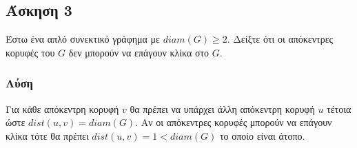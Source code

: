 \subsection*{Άσκηση 3}

Έστω ένα απλό συνεκτικό γράφημα με $diam(G) \ge 2$. Δείξτε ότι οι απόκεντρες κορυφές του $G$ δεν μπορούν να επάγουν κλίκα στο $G$.

\subsubsection*{Λύση}

Για κάθε απόκεντρη κορυφή $v$ θα πρέπει να υπάρχει άλλη απόκεντρη κορυφή $u$ τέτοια ώστε $dist(u,v) = diam(G)$. 
Αν οι απόκεντρες κορυφές μπορούν να επάγουν κλίκα τότε θα πρέπει $dist(u,v) = 1 < diam(G)$ το οποίο είναι άτοπο.

